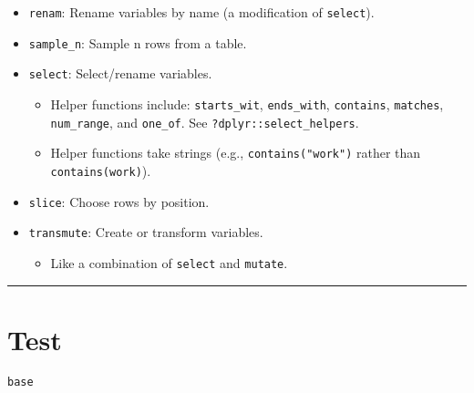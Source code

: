 \documentclass[
]{book}
\providecommand{\tightlist}{%
  \setlength{\itemsep}{0pt}\setlength{\parskip}{0pt}}
\begin{document}
\begin{itemize}
\tightlist
\item
  \texttt{renam}: Rename variables by name (a modification of \texttt{select}).
\item
  \texttt{sample\_n}: Sample n rows from a table.
\item
  \texttt{select}: Select/rename variables.

  \begin{itemize}
  \tightlist
  \item
    Helper functions include: \texttt{starts\_wit}, \texttt{ends\_with}, \texttt{contains}, \texttt{matches}, \texttt{num\_range}, and \texttt{one\_of}. See \texttt{?dplyr::select\_helpers}.
  \item
    Helper functions take strings (e.g., \texttt{contains("work")} rather than \texttt{contains(work)}).
  \end{itemize}
\item
  \texttt{slice}: Choose rows by position.
\item
  \texttt{transmute}: Create or transform variables.

  \begin{itemize}
  \tightlist
  \item
    Like a combination of \texttt{select} and \texttt{mutate}.
  \end{itemize}
\end{itemize}

\begin{center}\rule{0.5\linewidth}{0.5pt}\end{center}

\hypertarget{test-1}{%
\section{Test}\label{test-1}}

\texttt{base}
\end{document}
